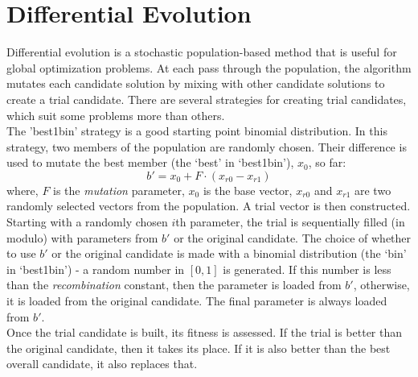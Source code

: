 \section{Differential Evolution}
Differential evolution is a stochastic population-based method that is useful for global optimization problems. At each pass through the population, the algorithm mutates each candidate solution by mixing with other candidate solutions to create a trial candidate. There are several strategies for creating trial candidates, which suit some problems more than others.\\
The 'best1bin' strategy is a good starting point binomial distribution. In this strategy, two members of the population are randomly chosen. Their difference is used to mutate the best member (the ‘best’ in ‘best1bin’), $x_0$, so far:
\begin{equation}
    b' = x_0 + F \cdot (x_{r0} - x_{r1})
\end{equation}
where, $F$ is the \textit{mutation} parameter, \(x_0\) is the base vector, \(x_{r0}\) and \(x_{r1}\) are two randomly selected vectors from the population. A trial vector is then constructed. Starting with a randomly chosen $i$th parameter, the trial is sequentially filled (in modulo) with parameters from $b'$ or the original candidate. The choice of whether to use $b'$ or the original candidate is made with a binomial distribution (the ‘bin’ in ‘best1bin’) - a random number in $[0,1]$ is generated. If this number is less than the \textit{recombination} constant, then the parameter is loaded from $b'$, otherwise, it is loaded from the original candidate. The final parameter is always loaded from $b'$.\\
Once the trial candidate is built, its fitness is assessed. If the trial is better than the original candidate, then it takes its place. If it is also better than the best overall candidate, it also replaces that.


